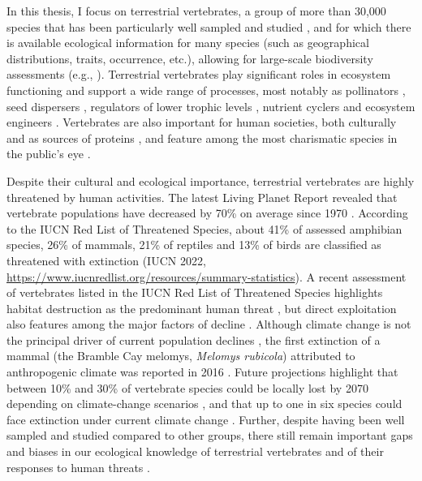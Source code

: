 In this thesis, I focus on terrestrial vertebrates, a group of more than 30,000 species that has been particularly well sampled and studied \citep{Titley2017}, and for which there is available ecological information for many species (such as geographical distributions, traits, occurrence, etc.), allowing for large-scale biodiversity assessments (e.g., \citet{Jenkins2013}). Terrestrial vertebrates  play significant roles in ecosystem functioning and support a wide range of processes, most notably as pollinators \citep{Ratto2018}, seed dispersers \citep{Tiffney2004}, regulators of lower trophic levels \citep{Barber2010, Salo2010, Luck2012, Lin2018, Zhang2018_trophicinter}, nutrient cyclers \citep{Wilson2011, Inger2016, Cunningham2018} and ecosystem engineers \citep{Severtsov2012}. Vertebrates are also important for human societies, both culturally and as sources of proteins \citep{Hirons2016, Albert2018, Alves2018}, and feature among the most charismatic species in the public’s eye \citep{Courchamp2018, Albert2018}.

Despite their cultural and ecological importance, terrestrial vertebrates are highly threatened by human activities. The latest Living Planet Report revealed that vertebrate populations have decreased by 70\% on average since 1970 \citep{WWF2020}. According to the IUCN Red List of Threatened Species, about 41\% of assessed amphibian species, 26\% of mammals, 21\% of reptiles and 13\% of birds are classified as threatened with extinction (IUCN 2022, \url{https://www.iucnredlist.org/resources/summary-statistics}). A recent assessment of vertebrates listed in the IUCN Red List of Threatened Species highlights habitat destruction as the predominant human threat \citep{Cox2022}, but direct exploitation also features among the major factors of decline \citep{Monastersky2014}. Although climate change is not the principal driver of current population declines \citep{Caro2022}, the first extinction of a mammal (the Bramble Cay melomys, \textit{Melomys rubicola}) attributed to anthropogenic climate was reported in 2016 \citep{Watson2016}. Future projections highlight that between 10\% and 30\% of vertebrate species could be locally lost by 2070 depending on climate-change scenarios \citep{Newbold2018}, and that up to one in six species could face extinction under current climate change \citep{Urban2015}. Further, despite having been well sampled and studied compared to other groups, there still remain important gaps and biases in our ecological knowledge of terrestrial vertebrates and of their responses to human threats \citep{Meyer2015, Meiri2016, Hevia2017, Oliver2021}.


